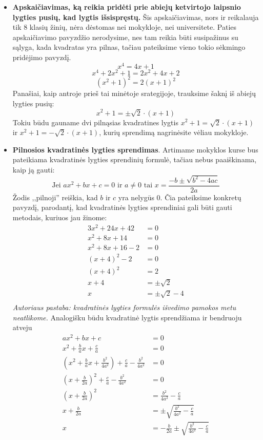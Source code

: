 \documentclass{article}
\begin{document}
\begin{itemize} \item \textbf{Apskaičiavimas, ką reikia pridėti prie abiejų ketvirtojo laipsnio lygties pusių, kad lygtis išsispręstų.} Šis apskaičiavimas, nors ir reikalauja tik 8 klasių žinių, nėra dėstomas nei mokykloje, nei universitete. Paties apskaičiavimo pavyzdžio nerodysime, nes tam reikia būti susipažinus su sąlyga, kada kvadratas yra pilnas, tačiau pateiksime vieno tokio sėkmingo pridėjimo pavyzdį. 
$$x^4=4x+1$$
$$x^4+2x^2+1=2x^2+4x+2$$
$$(x^2+1)^2=2(x+1)^2$$
Panašiai, kaip antroje prieš tai minėtoje srategijoje, trauksime šaknį iš abiejų lygties pusių:
$$x^2+1=\pm\sqrt{2}\cdot(x+1)$$
Tokiu būdu gauname dvi pilnąsias kvadratines lygtis $x^2+1=\sqrt{2}\cdot(x+1)$ ir $x^2+1=-\sqrt{2}\cdot(x+1)$, kurių sprendimą nagrinėsite vėliau mokykloje.
\item \textbf{Pilnosios kvadratinės lygties sprendimas}. Artimame mokyklos kurse bus pateikiama kvadratinės lygties sprendinių formulė, tačiau nebus paaiškinama, kaip ją gauti:
$$\text{Jei }ax^2+bx+c=0\text{ ir $a\neq 0$ tai }x=\frac{-b\pm\sqrt{b^2-4ac}}{2a}$$
Žodis ,,pilnoji'' reiškia, kad $b$ ir $c$ yra nelygūs 0. Čia pateiksime konkretų pavyzdį, parodantį, kad kvadratinės lygties sprendiniai gali būti gauti metodais, kuriuos jau žinome:
\begin{equation*}
\begin{split}
3x^2+24x+42 & =0\\
x^2+8x+14 & =0\\
x^2+8x+16-2 & =0\\
(x+4)^2-2 & =0\\
(x+4)^2 & =2\\
x+4 & =\pm \sqrt{2}\\
x & =\pm \sqrt{2} - 4\\
\end{split}
\end{equation*}
\textit{Autoriaus pastaba: kvadratinės lygties formulės išvedimo pamokos metu neatlikome.} Analogišku būdu kvadratinė lygtis sprendžiama ir bendruoju atveju
\begin{equation*}
\begin{split}
ax^2+bx+c & = 0 \\
x^2+\frac{b}{a}x+\frac{c}{a} & = 0\\
\left(x^2+\frac{b}{a}x+\frac{b^2}{4a^2}\right)+\frac{c}{a}-\frac{b^2}{4a^2} &=0\\
\left(x+\frac{b}{2a}\right)^2+\frac{c}{a}-\frac{b^2}{4a^2} & =0 \\
\left(x+\frac{b}{2a}\right)^2 & =\frac{b^2}{4a^2}-\frac{c}{a}\\
x+\frac{b}{2a} & =\pm\sqrt{\frac{b^2}{4a^2}-\frac{c}{a}} \\
x & =-\frac{b}{2a}\pm\sqrt{\frac{b^2}{4a^2}-\frac{c}{a}} \\
\end{split}
\end{equation*}
\end{itemize}
\end{document}
